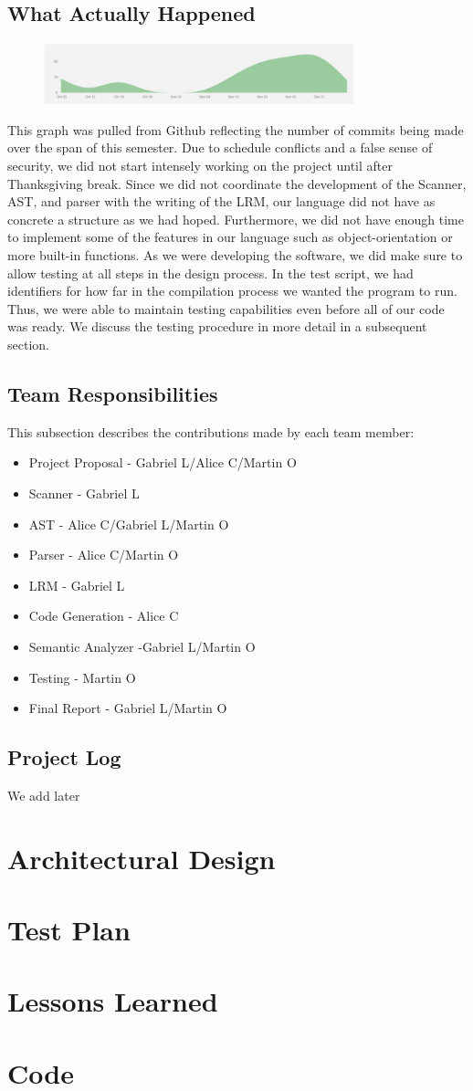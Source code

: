 \documentclass[11pt]{report}
\begin{document}
\section{What Actually Happened}
\begin{figure}[h]
	\centering
	\includegraphics[width=0.8\textwidth]{Github_Graph}
\end{figure}
This graph was pulled from Github reflecting the number of commits being made over the span of this semester. Due to schedule conflicts and a false sense of security, we did not start intensely working on the project until after Thanksgiving break. Since we did not coordinate the development of the Scanner, AST, and parser with the writing of the LRM, our language did not have as concrete a structure as we had hoped. Furthermore, we did not have enough time to implement some of the features in our language such as object-orientation or more built-in functions. As we were developing the software, we did make sure to allow testing at all steps in the design process. In the test script, we had identifiers for how far in the compilation process we wanted the program to run. Thus, we were able to maintain testing capabilities even before all of our code was ready. We discuss the testing procedure in more detail in a subsequent section. 
\section{Team Responsibilities}
This subsection describes the contributions made by each team member:
\begin{itemize}
\item Project Proposal - Gabriel L/Alice C/Martin O
\item Scanner - Gabriel L
\item AST - Alice C/Gabriel L/Martin O
\item Parser - Alice C/Martin O
\item LRM - Gabriel L
\item Code Generation - Alice C
\item Semantic Analyzer -Gabriel L/Martin O
\item Testing - Martin O 
\item Final Report - Gabriel L/Martin O
\end{itemize}

\section{Project Log}
We add later 

\chapter{Architectural Design}
\chapter{Test Plan}
\chapter{Lessons Learned}
\appendix
\chapter{Code}
\end{document}

